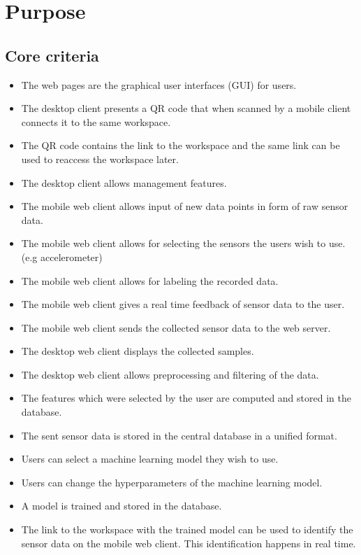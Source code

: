 \section{Purpose}

\subsection{Core criteria}
\begin{itemize}
    \item The web pages are the graphical user interfaces (GUI) for users.
    \item The desktop client presents a QR code that when scanned by a mobile client connects it to the same \gls{workspace}.
    \item The QR code contains the link to the \gls{workspace} and the same link can be used to reaccess the workspace later.
    \item The desktop client allows management features.
    \item The mobile web client allows input of new data points in form of raw sensor data.
    \item The mobile web client allows for selecting the sensors the users wish to use. (e.g accelerometer)
    \item The mobile web client allows for labeling the recorded data.
    \item The mobile web client gives a real time feedback of sensor data to the user.
    \item The mobile web client sends the collected sensor data to the web server.
    \item The desktop web client displays the collected samples.
    \item The desktop web client allows preprocessing and filtering of the data.
    \item The features which were selected by the user are computed and stored in the database.
    \item The sent sensor data is stored in the central database in a unified format.
    \item Users can select a machine learning model they wish to use.
    \item Users can change the hyperparameters of the machine learning model.
    \item A model is trained and stored in the database.
    \item The link to the workspace with the trained model can be used to identify the sensor data on the mobile web client. This identification happens in real time.
\end{itemize}

